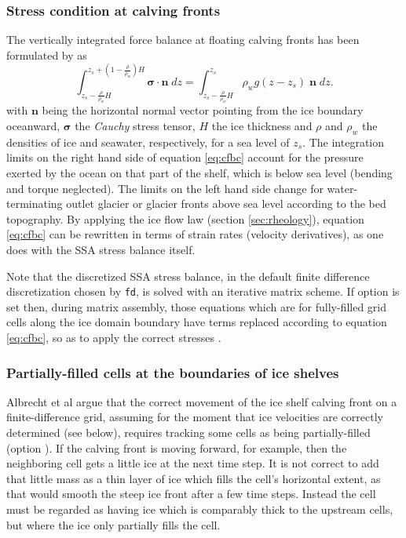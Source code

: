 \subsubsection{Stress condition at calving fronts}
\label{subsec:cfbc}

The vertically integrated force balance at floating calving fronts has been formulated by \cite{Morland} as
\begin{equation}
\int_{z_s-\frac{\rho}{\rho_w}H}^{z_s+(1-\frac{\rho}{\rho_w})H}\mathbf{\sigma}\cdot\mathbf{n}\;dz = \int_{z_s-\frac{\rho}{\rho_w}H}^{z_s}\rho_w g (z-z_s) \;\mathbf{n}\;dz.
\label{eq:cfbc}
\end{equation}
with $\mathbf{n}$ being the horizontal normal vector pointing from the ice boundary oceanward, $\mathbf{\sigma}$ the \emph{Cauchy} stress tensor, $H$ the ice thickness and $\rho$ and $\rho_{w}$ the densities of ice and seawater, respectively, for a sea level of $z_s$. The integration limits on the right hand side of equation \eqref{eq:cfbc} account for the pressure exerted by the ocean on that part of the shelf, which is below sea level (bending and torque neglected). The limits on the left hand side change for water-terminating outlet glacier or glacier fronts above sea level according to the bed topography.  By applying the ice flow law (section \ref{sec:rheology}), equation \eqref{eq:cfbc} can be rewritten in terms of strain rates (velocity derivatives), as one does with the SSA stress balance itself.

Note that the discretized SSA stress balance, in the default finite difference discretization chosen by  \texttt{fd}, is solved with an iterative matrix scheme.  If option  is set then, during matrix assembly, those equations which are for fully-filled grid cells along the ice domain boundary have terms replaced according to equation \eqref{eq:cfbc}, so as to apply the correct stresses \cite{Albrechtetal2011,Winkelmannetal2011}.

\subsubsection{Partially-filled cells at the boundaries of ice shelves}
\label{subsec:part-grid}

Albrecht et al \cite{Albrechtetal2011} argue that the correct movement of the ice shelf calving front on a finite-difference grid, assuming for the moment that ice velocities are correctly determined (see below), requires tracking some cells as being partially-filled (option ).  If the calving front is moving forward, for example, then the neighboring cell gets a little ice at the next time step.  It is not correct to add that little mass as a thin layer of ice which fills the cell's horizontal extent, as that would smooth the steep ice front after a few time steps.  Instead the cell must be regarded as having ice which is comparably thick to the upstream cells, but where the ice only partially fills the cell.

